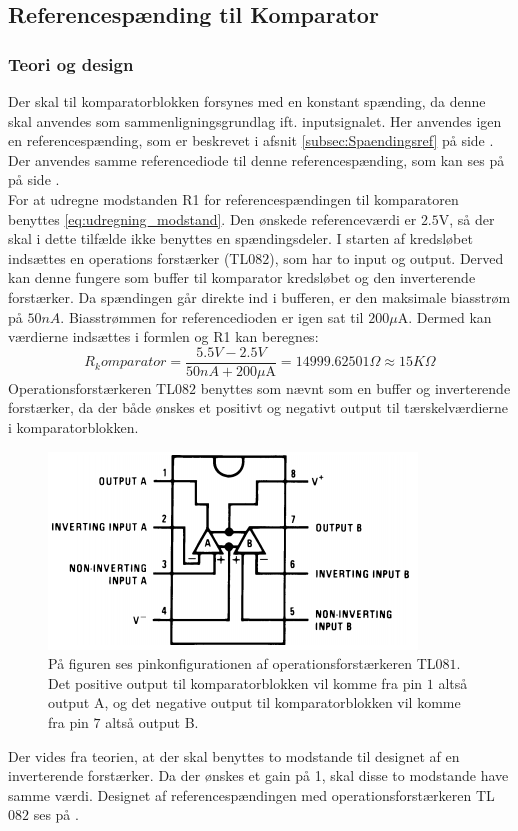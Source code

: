 \subsection{Referencespænding til Komparator}\label{subsec:Spaendingsref_Komparator}
\subsubsection{Teori og design}
Der skal til komparatorblokken forsynes med en konstant spænding, da denne skal anvendes som sammenligningsgrundlag ift. inputsignalet. Her anvendes igen en referencespænding, som er beskrevet i afsnit \ref{subsec:Spaendingsref} på side \pageref{subsec:Spaendingsref}. Der anvendes samme referencediode til denne referencespænding, som kan ses på  på side \pageref{subsec:Spaendingsref}. \\
For at udregne modstanden R1 for referencespændingen til komparatoren benyttes \eqref{eq:udregning_modstand}. Den ønskede referenceværdi er $2.5$V, så der skal i dette tilfælde ikke benyttes en spændingsdeler. I starten af kredsløbet indsættes en operations forstærker (TL$082$), som har to input og output. Derved kan denne fungere som buffer til komparator kredsløbet og den inverterende forstærker. Da spændingen går direkte ind i bufferen, er den maksimale biasstrøm på $50nA$. Biasstrømmen for referencedioden er igen sat til $200\mu$A. Dermed kan værdierne indsættes i formlen og R1 kan beregnes:
\begin{equation}
R_komparator = \frac{5.5V-2.5V}{50nA + 200\mu\text{A}} = 14999.62501\Omega \approx 15K\Omega 
\end{equation} 
Operationsforstærkeren TL$082$ benyttes som nævnt som en buffer og inverterende forstærker, da der både ønskes et positivt og negativt output til tærskelværdierne i komparatorblokken.
\begin{figure}[H]
	\centering
	\includegraphics[scale=0.65]{figures/cProblemloesning/TL082.PNG}
	\caption{På figuren ses pinkonfigurationen af operationsforstærkeren TL$081$. Det positive output til komparatorblokken vil komme fra pin $1$ altså output A, og det negative output til komparatorblokken vil komme fra pin $7$ altså output B.}
	\label{fig:TL082}
\end{figure}
\noindent Der vides fra teorien, at der skal benyttes to modstande til designet af en inverterende forstærker. Da der ønskes et gain på 1, skal disse to modstande have samme værdi. \cite{Nilsson2011} Designet af referencespændingen med operationsforstærkeren TL$082$ ses på .

